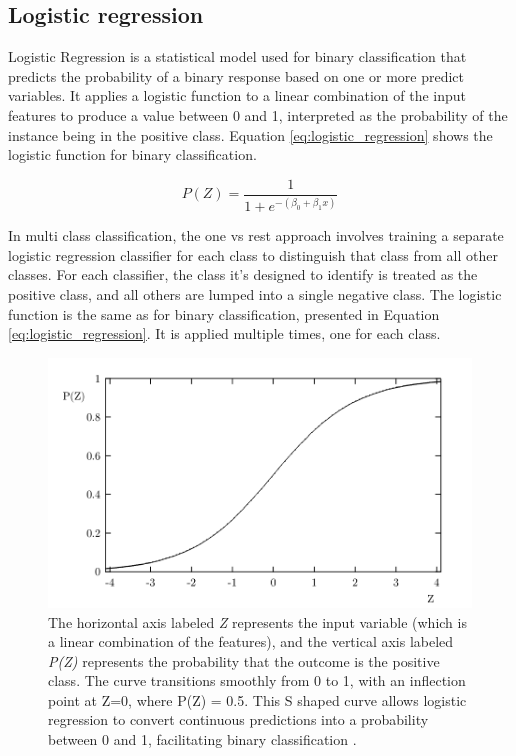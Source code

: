         \newpage

        \subsection{Logistic regression}
            Logistic Regression is a statistical model used for binary classification that predicts the probability of a binary response based on one or more predict variables. It applies a logistic function to a linear combination of the input features to produce a value between 0 and 1, interpreted as the probability of the instance being in the positive class.
            Equation \ref{eq:logistic_regression} shows the logistic function for binary classification.

            \begin{equation} \label{eq:logistic_regression}
                P(Z) = \frac{1}{1 + e^{-(\beta_0 + \beta_1 x)}}
            \end{equation}

            In multi class classification, the one vs rest approach involves training a separate logistic regression classifier for each class to distinguish that class from all other classes. For each classifier, the class it's designed to identify is treated as the positive class, and all others are lumped into a single negative class.
            The logistic function is the same as for binary classification, presented in Equation \ref{eq:logistic_regression}. It is applied multiple times, one for each class.
            
            \begin{figure}[htbp]
                \centering
                \includegraphics[width=.8\textwidth]{../src/resources/images/models/logistic.png}
                \caption{
                    The horizontal axis labeled \textit{Z} represents the input variable (which is a linear combination of the features), and the vertical axis labeled \textit{P(Z)} represents the probability that the outcome is the positive class. The curve transitions smoothly from 0 to 1, with an inflection point at Z=0, where P(Z) = 0.5. This S shaped curve allows logistic regression to convert continuous predictions into a probability between 0 and 1, facilitating binary classification \cite{cramer_origins_2002}.
                }
                \label{fig:logistic_regression}
            \end{figure}

